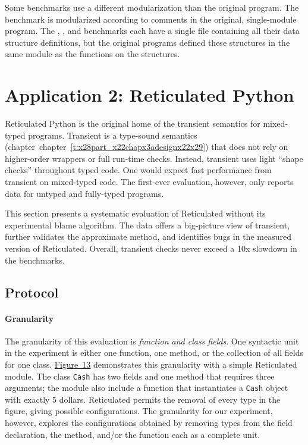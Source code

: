 \documentclass[ twoside,open=right,titlepage,numbers=noenddot,headinclude,%
                footinclude=true,cleardoublepage=empty,abstract=off,
                BCOR=5mm,paper=a4,fontsize=11pt,%
                ngerman,american,%
                parts,pdfspacing]{scrreprt}
\newcommand{\ChapRef}[2]{\SecRef{#1}{#2}}
\newcommand{\SecRef}[2]{section~#1}
\newcommand{\ChapRefLocal}[3]{\hyperref[#1]{\ChapRef{#2}{#3}}}
\newcommand{\Scribtexttt}[1]{{\texttt{#1}}}
\let\SOriginalthesubsubsection\thesubsubsection
\newcommand{\Ssubsection}[2]{\subsection[#1]{#2}\let\thesubsubsection\SOriginalthesubsubsection}
\newcommand{\Ssubsubsection}[2]{\subsubsection[#1]{#2}}
\newcommand{\FigureRef}[2]{#1}
\renewcommand{\Ssubsection}[2]{\section[#1]{#2}}
\renewcommand{\Ssubsubsection}[2]{\subsection[#1]{#2}}
\renewcommand{\ChapRefLocal}[3]{chapter~\ref{#1}}
\begin{document}
Some benchmarks use a different modularization than the original program.
The  benchmark is modularized according to comments in the original,
 single{-}module program.
The , , and  benchmarks each have a single
 file containing all their data structure definitions, but the original programs
 defined these structures in the same module as the functions on the structures.

\Ssubsection{Application 2: Reticulated Python}{Application 2: Reticulated Python}\label{t:x28part_x22secx3arpx3aevaluationx22x29}

Reticulated Python is the original home of the transient semantics for
 mixed{-}typed programs.
Transient is a type{-}sound semantics (chapter~\ChapRefLocal{t:x28part_x22chapx3adesignx22x29}{4}{Design Analysis Method})
 that does not rely on higher{-}order wrappers or full run{-}time checks.
Instead, transient uses light {``}shape checks{''} throughout typed code.
One would expect fast performance from transient on mixed{-}typed code.
The first{-}ever evaluation, however, only reports data for untyped and fully{-}typed
 programs.

This section presents a systematic evaluation of
 Reticulated without its experimental blame algorithm.
The data offers a big{-}picture view of transient,
 further validates the approximate method,
 and identifies bugs in the measured version of Reticulated.
Overall, transient checks never exceed a 10x slowdown in the benchmarks.

\Ssubsubsection{Protocol}{Protocol}\label{t:x28part_x22secx3arpx3aprotocolx22x29}

\paragraph{Granularity}
The granularity of this evaluation is \emph{function and class fields}.
One syntactic unit in the experiment is either one function,
 one method, or the collection of all fields for one class.
\hyperref[t:x28counter_x28x22figurex22_x22figx3arpx3aexamplex2dclassx22x29x29]{Figure~\FigureRef{13}{t:x28counter_x28x22figurex22_x22figx3arpx3aexamplex2dclassx22x29x29}} demonstrates this granularity with
 a simple Reticulated module.
The class \Scribtexttt{Cash} has two fields and one method that requires three arguments;
 the module also include a function that instantiates a \Scribtexttt{Cash} object with exactly
 5 dollars.
Reticulated permits the removal of every type in the figure, giving
  possible configurations.
The granularity for our experiment, however, explores the  configurations
 obtained by removing types from the field declaration, the method, and/or the
 function each as a complete unit.
\end{document}

